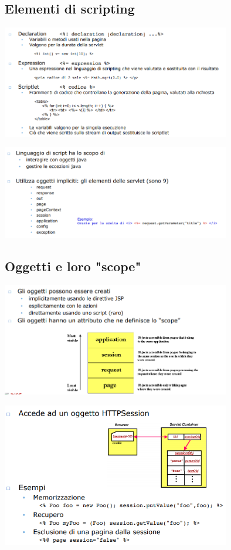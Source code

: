 \documentclass[12pt, a4paper, openany, twoside]{book}
\begin{document}
\subsection{Elementi di scripting}
\begin{center}
\includegraphics[width=0.75\textwidth]{12}
\end{center}
\begin{center}
\includegraphics[width=0.75\textwidth]{13}
\end{center}
\subsection{Oggetti e loro "scope"}
\begin{center}
\includegraphics[width=0.75\textwidth]{14}
\end{center}
\begin{center}
\includegraphics[width=0.75\textwidth]{15}
\end{center}
\end{document}
